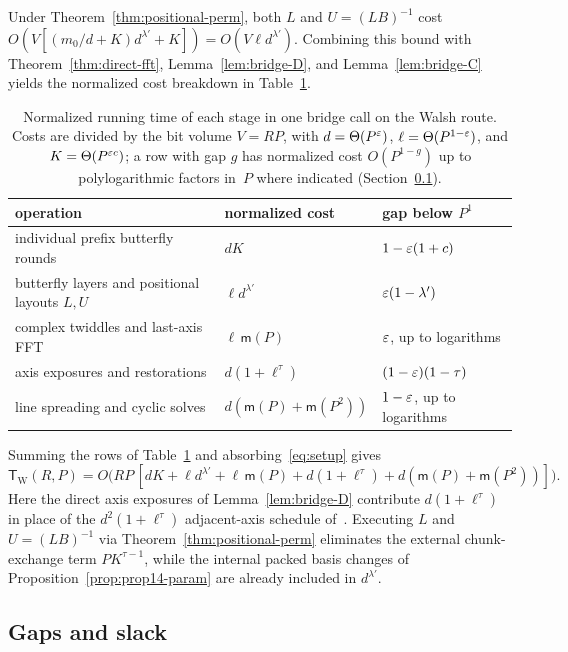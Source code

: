 Under Theorem~\ref{thm:positional-perm}, both $L$ and $U=(LB)^{-1}$ cost
$O(V[(m_0/d+K)d^{\lambda'}+K])=O(V\ell d^{\lambda'})$. Combining this bound with Theorem~\ref{thm:direct-fft},
Lemma~\ref{lem:bridge-D}, and Lemma~\ref{lem:bridge-C} yields the normalized cost breakdown in
Table~\ref{tab:cost-walsh}.

\begin{table}[ht]
\centering
\small
\caption{Normalized running time of each stage in one bridge call on the Walsh route. Costs are divided by the bit
volume $V=RP$, with $d=\Theta(P^\varepsilon)$, $\ell=\Theta(P^{1-\varepsilon})$, and $K=\Theta(P^{\varepsilon c})$; a row with gap $g$ has
normalized cost $O(P^{1-g})$ up to polylogarithmic factors in~$P$ where indicated
(Section~\ref{sec:main-gaps}).}\label{tab:cost-walsh}
\begin{tabular}{@{}lll@{}}
\toprule
operation & normalized cost & gap below $P^1$\\
\midrule
individual prefix butterfly rounds & $dK$ & $1-\varepsilon(1+c)$\\
butterfly layers and positional layouts $L,U$ & $\ell d^{\lambda'}$ & $\varepsilon(1-\lambda')$\\
complex twiddles and last-axis FFT & $\ell\,\mathsf m(P)$ & $\varepsilon$, up to logarithms\\
axis exposures and restorations & $d(1+\ell^\tau)$ & $(1-\varepsilon)(1-\tau)$\\
line spreading and cyclic solves & $d(\mathsf m(P)+\mathsf m(P^2))$ & $1-\varepsilon$, up to logarithms\\
\bottomrule
\end{tabular}
\end{table}

Summing the rows of Table~\ref{tab:cost-walsh} and absorbing~\eqref{eq:setup} gives
\begin{equation}\label{eq:cost-W}
  \mathsf T_{\mathrm W}(R,P)=O\bigl(RP\,[dK+\ell d^{\lambda'}+\ell\,\mathsf m(P)+d(1+\ell^\tau)
  +d(\mathsf m(P)+\mathsf m(P^2))]\bigr).
\end{equation}
Here the direct axis exposures of Lemma~\ref{lem:bridge-D} contribute $d(1+\ell^\tau)$ in place of the
$d^2(1+\ell^\tau)$ adjacent-axis schedule of~\cite[\S9]{OAI26}. Executing $L$ and $U=(LB)^{-1}$ via
Theorem~\ref{thm:positional-perm} eliminates the external chunk-exchange term $PK^{\tau-1}$, while the internal packed
basis changes of Proposition~\ref{prop:prop14-param} are already included in $d^{\lambda'}$.

\subsection{Gaps and slack}\label{sec:main-gaps}

